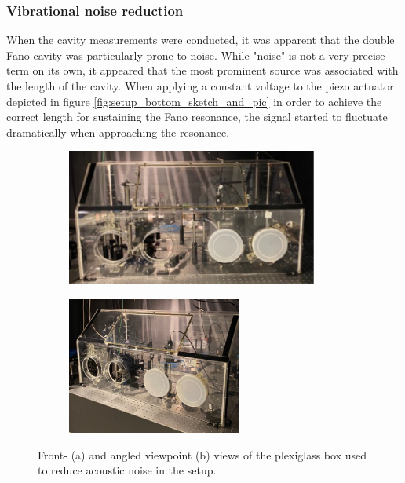 \subsubsection{Vibrational noise reduction}\label{sec:vibrational_noise_reduction}

When the cavity measurements were conducted, it was apparent that the double Fano cavity was particularly prone to noise. While "noise" is not a very precise term on its own, it appeared that the most prominent source was associated with the length of the cavity. When applying a constant voltage to the piezo actuator depicted in figure \ref{fig:setup_bottom_sketch_and_pic} in order to achieve the correct length for sustaining the Fano resonance, the signal started to fluctuate dramatically when approaching the resonance. 

\begin{figure}[h!]
    \centering
    \begin{subfigure}[b]{0.49\textwidth}
        \centering
        \includegraphics[height=4.5cm]{figures/noise_box_front.pdf}
        \caption{}
        \label{fig:box_front}
    \end{subfigure}
    \begin{subfigure}[b]{0.49\textwidth}
        \centering
        \includegraphics[height=4.5cm]{figures/noise_box_side.pdf}
        \caption{}
        \label{fig:box_side}
    \end{subfigure}
    \caption{Front- (a) and angled viewpoint (b) views of the plexiglass box used to reduce acoustic noise in the setup.}
    \label{fig:noise_box}
\end{figure}

